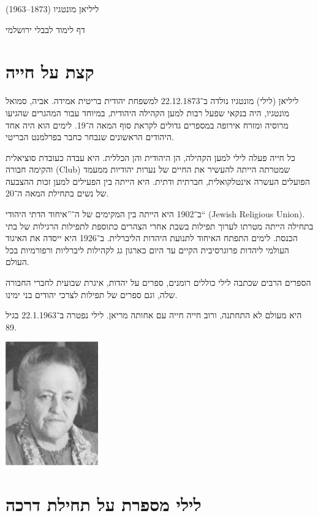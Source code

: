 \documentclass[14pt, article, extrafontsizes, twopage, a4paper]{memoir}
\begin{document}
{
  \centering
  \LARGE ליליאן מונטגיו (1873–1963)

  \Large דף לימוד לבבלי ירושלמי

}

\chapter{קצת על חייה}

ליליאן (לילי) מונטגיו נולדה ב־22.12.1873 למשפחת יהודית בריטית אמידה. אביה, סמואל מונטגיו, היה בנקאי שפעל רבות למען הקהילה היהודית, במיוחד עבור המהגרים שהגיעו מרוסיה ומזרח אירופה במספרים גדולים לקראת סוף המאה ה־19. לימים הוא היה אחד היהודים הראשונים שנבחר כחבר בפרלמנט הבריטי.

כל חייה פעלה לילי למען הקהילה, הן היהודית והן הכללית. היא עבדה כעובדת סוציאלית והקימה חבורה (\textenglish{Club}) שמטרתה הייתה להעשיר את החיים של נערות יהודיות ממעמד הפועלים העשרה אינטלקואלית, חברתית ודתית. היא הייתה בין הפעילים למען זכות ההצבעה של נשים בתחילת המאה ה־20.

ב־1902 היא הייתה בין המקימים של ה־”איחוד הדתי היהודי“ (\textenglish{Jewish Religious Union}). בתחילה הייתה מטרתו לערוך תפילות בשבת אחרי הצהרים  כתוספת לתפילות הרגילות של בתי הכנסת. לימים התפתח האיחוד לתנועת היהדות הליברלית. ב־1926 היא ייסדה את האיגוד העולמי ליהדות פרוגרסיבית הקיים עד היום כארגון גג לקהילות ליברליות ורפורמיות בכל העולם.

הספרים הרבים שכתבה לילי כוללים רומנים, ספרים על יהדות, איגרת שבועית לחברי החבורה שלה, וגם ספרים של תפילות לצרכי יהודים בני ימינו.

היא מעולם לא התחתנה, ורוב חייה חייה עם אחותה מריאן. לילי נפטרה ב־22.1.1963 בגיל 89.

{
  \centering
\includegraphics[width=4cm]{lilyolder.png}\\

}


\chapter{לילי מספרת על תחילת דרכה}
\end{document}

